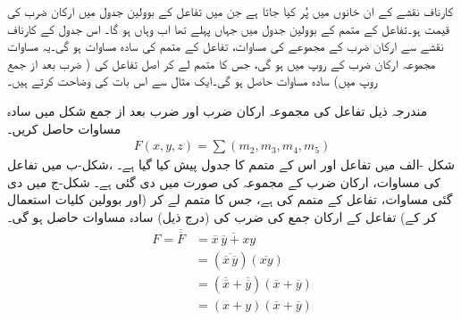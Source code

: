  کارناف نقشے کے ان خانوں میں  پُر کیا جاتا ہے جن میں تفاعل کے بوولین جدول میں ارکان ضرب کی قیمت  ہو۔تفاعل کے متمم کے بوولین جدول میں جہاں پہلے  تھا اب وہاں  ہو گا۔ اس جدول کے کارناف نقشے سے ارکان ضرب کے مجموعے کی مساوات، تفاعل کے متمم کی سادہ مساوات ہو گی۔یہ مساوات مجموعہ ارکان ضرب کے روپ میں ہو گی، جس کا متمم لے کر اصل تفاعل کی ( ضرب بعد از جمع  روپ میں) سادہ مساوات حاصل ہو گی۔ایک مثال سے اس بات کی وضاحت کرتے ہیں۔

مندرجہ ذیل تفاعل کی  مجموعہ ارکان ضرب اور  ضرب بعد از جمع  شکل میں سادہ مساوات حاصل کریں۔
\begin{align*}
F(x,y,z)=\sum(m_2,m_3,m_4,m_5)
\end{align*}
\quad
شکل -الف میں تفاعل اور اس کے متمم کا جدول پیش کیا گیا ہے۔ ،شکل-ب میں تفاعل کی مساوات، ارکان ضرب کے مجموعہ کی صورت میں دی گئی ہے۔ شکل-ج میں دی گئی مساوات، تفاعل کے متمم کی ہے، جس کا متمم لے کر (اور بوولین کلیات استعمال کر کے) تفاعل کے ارکان جمع کی ضرب کی (درج ذیل) سادہ مساوات حاصل ہو گی۔
\begin{align*}
F=\overline{\overline{F}}&=\overline{\overline{x}\,\overline{y}+xy}\\
&=(\overline{\overline{x}\,\overline{y}})(\overline{xy})\\
&=(\overline{\overline{x}}+\overline{\overline{y}})(\overline{x}+\overline{y})\\
&=(x+y)(\overline{x}+\overline{y})
\end{align*}
%
